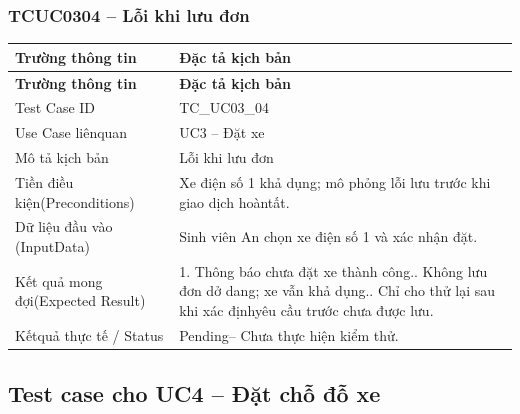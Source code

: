\subsubsection{TCUC0304 – Lỗi khi lưu đơn}
\begin{longtable}{|L{0.24\textwidth}|L{0.70\textwidth}|}
\hline
\textbf{Trường thông tin} & \textbf{Đặc tả kịch bản} \\
\hline
\endfirsthead
\hline
\textbf{Trường thông tin} & \textbf{Đặc tả kịch bản} \\
\hline
\endhead
Test Case ID & TC\_UC03\_04 \\
\hline
Use Case liênquan & UC3 – Đặt xe \\
\hline
Mô tả kịch bản & Lỗi khi lưu đơn \\
\hline
Tiền điều kiện\newline (Preconditions) & Xe điện số 1 khả dụng; mô phỏng lỗi lưu trước khi giao dịch hoàn\newline tất. \\
\hline
Dữ liệu đầu vào (Input\newline Data) & Sinh viên An chọn xe điện số 1 và xác nhận đặt. \\
\hline
Kết quả mong đợi\newline (Expected Result) & 1. Thông báo chưa đặt xe thành công.. Không lưu đơn dở dang; xe vẫn khả dụng.. Chỉ cho thử lại sau khi xác địnhyêu cầu trước chưa được lưu. \\
\hline
Kếtquả thực tế / Status & Pending– Chưa thực hiện kiểm thử. \\
\hline
\end{longtable}
\vspace{-0.5\baselineskip}
\subsection{Test case cho UC4 – Đặt chỗ đỗ xe}
